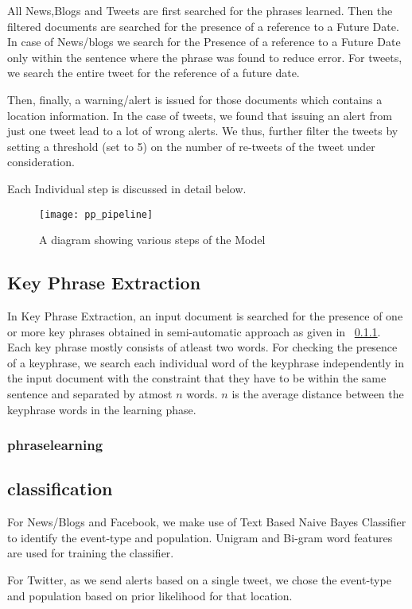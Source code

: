 
All News,Blogs and Tweets are first searched for the phrases learned. Then the filtered documents are searched for the presence of a reference to a Future Date. In case of News/blogs we search for the Presence of a reference to a Future Date only within the sentence where the phrase was found to reduce error. For tweets, we search the entire tweet for the reference of a future date.

Then, finally, a warning/alert is issued for those documents which contains a location information. In the case of tweets, we found that issuing an alert from just one tweet lead to a lot of wrong alerts. We thus, further filter the tweets by setting a threshold (set to 5) on the number of re-tweets of the tweet under consideration.

Each Individual step is discussed in detail below.

\begin{figure*}
\texttt{[image: pp\_pipeline]}
\caption{A diagram showing various steps of the Model}
\end{figure*}

\subsection{Key Phrase Extraction}
In Key Phrase Extraction, an input document is searched for the presence of one or more key phrases obtained in semi-automatic approach as given in ~\ref{sec:phraselearning}. Each key phrase mostly consists of atleast two words. 
For checking the presence of a keyphrase, we search each individual word of the keyphrase independently in the input document with the constraint that they have to be within the same sentence and separated by atmost $n$ words.
$n$ is the average distance between the keyphrase words in the learning phase.



\subsubsection{phraselearning}
\label{sec:phraselearning}



\subsection{classification}
For News/Blogs and Facebook, we make use of Text Based Naive Bayes Classifier to identify the event-type and population. Unigram and Bi-gram word features are used for training the classifier.

For Twitter, as we send alerts based on a single tweet, we chose the event-type and population based on prior likelihood for that location.

